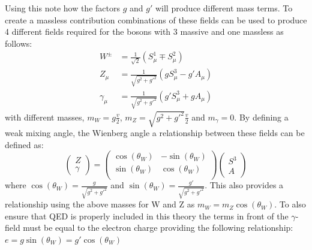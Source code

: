Using this note how the factors $g$ and $g'$ will produce different mass terms. To create a massless contribution combinations of these fields can be used to produce 4 different fields required for the bosons with 3 massive and one massless as follows:
\begin{align}
W^\pm &= \frac{1}{\sqrt{2}}(S_\mu^1 \mp S_\mu^2)\\
Z_\mu &= \frac{1}{\sqrt{g^2+g'^2}}(gS_\mu^3 - g' A_\mu)\\
\gamma_\mu &= \frac{1}{\sqrt{g^2+g'^2}}(g'S_\mu^3 + g A_\mu)
\end{align}
with different masses, $m_W = g\frac{v}{2}$, $m_Z = \sqrt{g^2+g'^2}\frac{v}{2}$ and $m_\gamma = 0$. By defining a weak mixing angle, the Wienberg angle a relationship between these fields can be defined as:
\begin{equation}
\begin{pmatrix}
    Z\\
 \gamma
\end{pmatrix}
=
\begin{pmatrix}
    \cos(\theta_W) & -\sin(\theta_W)\\
    \sin(\theta_W) & \cos(\theta_W)\\
\end{pmatrix}
\begin{pmatrix}
    S^3\\
  A
\end{pmatrix}
\end{equation}
where $\cos(\theta_W) = \frac{g}{\sqrt{g^2+g'^2}}$ and $\sin(\theta_W) = \frac{g'}{\sqrt{g^2+g'^2}}$. This also provides a relationship using the above masses for W and Z as $m_W = m_Z \cos(\theta_W)$. To also ensure that QED is properly included in this theory the terms in front of the $\gamma$-field must be equal to the electron charge providing the following relationship:
$e = g \sin(\theta_W) = g' \cos(\theta_W)$

